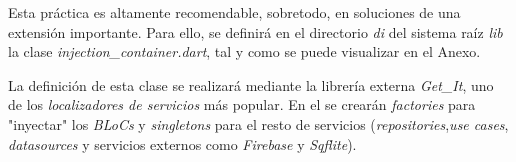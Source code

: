Esta práctica es altamente recomendable, sobretodo, en soluciones de una
extensión importante. Para ello, se definirá en el directorio \textit{di} del sistema raíz \textit{lib} la clase
\textit{injection\_container.dart}, tal y como se puede visualizar en el Anexo.

La definición de esta clase se realizará mediante la librería externa \textit{Get\_It}, uno de los \textit{localizadores de servicios}
más popular. En el se crearán \textit{factories} para "inyectar" los \textit{BLoCs} y \textit{singletons} para el resto de
servicios (\textit{repositories},\textit{use cases}, \textit{datasources} y servicios externos como \textit{Firebase} y \textit{Sqflite}).